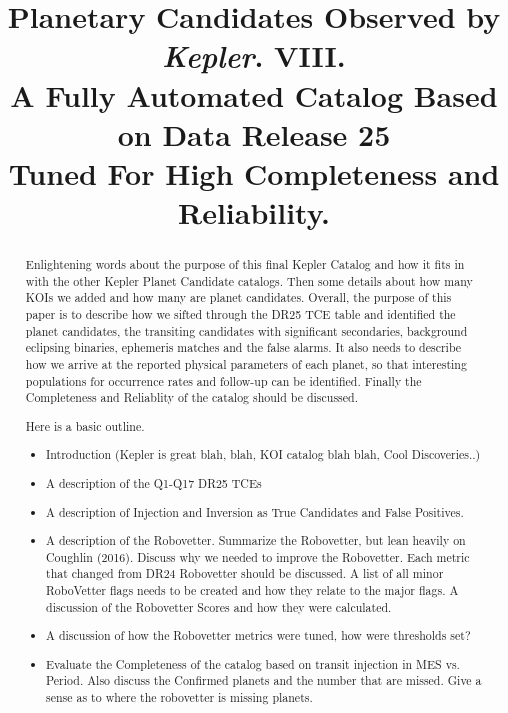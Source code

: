 \documentclass[apj,twocolappendix,numberedappendix]{emulateapj}
\renewcommand{\_}{\discretionary{\underscore}{}{\underscore}}  %
\newcommand\Kepler{\textit{Kepler}}
\begin{document}

\title{Planetary Candidates Observed by \Kepler. VIII.\\
A Fully Automated Catalog Based on Data Release 25\\Tuned For High Completeness and Reliability. }



\begin{abstract}
Enlightening words about the purpose of this final Kepler Catalog and how it fits in with the other Kepler Planet Candidate catalogs. Then some details about how many KOIs we added and how many are planet candidates. 
Overall, the purpose of this paper is to describe how we sifted through the DR25 TCE table and identified the planet candidates, the transiting candidates with significant secondaries, background eclipsing binaries, ephemeris matches and the false alarms. It also needs to describe how we arrive at the reported physical parameters of each planet, so that interesting populations for occurrence rates and follow-up can be identified.  Finally the Completeness and Reliablity of the catalog should be discussed.


Here is a basic outline.
\begin{itemize}
\item Introduction  (Kepler is great blah, blah, KOI catalog blah blah, Cool Discoveries..)

\item A description of the Q1-Q17 DR25 TCEs

\item A description of Injection and Inversion as True Candidates and False Positives.

\item A description of the Robovetter. Summarize the Robovetter, but lean heavily on Coughlin (2016). Discuss why we needed to improve the Robovetter.  Each metric that changed from DR24 Robovetter should be discussed. A list of all minor RoboVetter flags needs to be created and how they relate to the major flags. A discussion of the Robovetter Scores and how they were calculated.

\item A discussion of how the Robovetter metrics were tuned, how were thresholds set? 

\item Evaluate the Completeness of the catalog based on transit injection in MES vs. Period. Also discuss the Confirmed planets and the number that are missed. Give a sense as to where the robovetter is missing planets.


\end{itemize}
\end{abstract}
\end{document}
